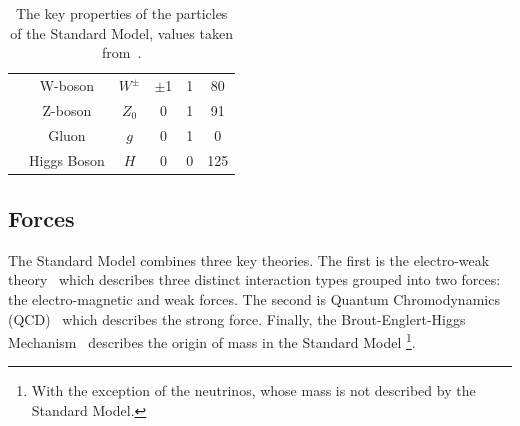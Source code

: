 {\begin{table}[!ht]
\begin{center}
\begin{tabular}{|c|c||c|c|c|c|}
                            &W-boson          &   $W^{\pm}$    & $\pm$1  &  1     &  80 \\
                            &Z-boson          &   $Z_0$       &  0      &  1     &  91\\
                            &Gluon            &   $g$         &  0      &  1     &  0 \\
                            &Higgs Boson      &   $H$         &  0      &  0     &  125\\
    \hline  
    \end{tabular} 
  \caption[The key properties of the particles of the Standard Model]
          {The key properties of the particles of the Standard Model, values taken from~\cite{obj-bjets_PDG}.}
  \label{tab:theo-sm_particles}
  \end{center}
  \end{table}}
  \vspace{-1em}

\subsection{Forces}
\label{sec:theo-sm_forces}

The Standard Model combines three key theories.
The first is the electro-weak theory~\cite{theo-glashow}
which describes three distinct interaction types grouped into two forces:
the electro-magnetic and weak forces.
The second is Quantum Chromodynamics (QCD)~\cite{theo-qcd} which describes the strong force.
Finally, the Brout-Englert-Higgs Mechanism~\cite{theo-be,theo-higgs} describes the origin of mass in the Standard Model
\footnote{With the exception of the neutrinos, whose mass is not described by the Standard Model.}.

